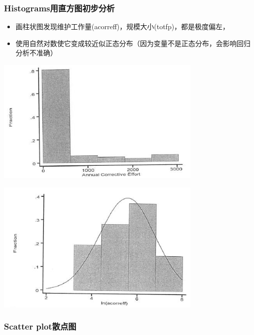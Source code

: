 \hypertarget{histogramsux7528ux76f4ux65b9ux56feux521dux6b65ux5206ux6790}{%
\subsubsection{Histograms用直方图初步分析}\label{histogramsux7528ux76f4ux65b9ux56feux521dux6b65ux5206ux6790}}

\begin{itemize}
\tightlist
\item
  画柱状图发现维护工作量(acorreff)，规模大小(totfp)，都是极度偏左，
\item
  使用自然对数使它变成较近似正态分布（因为变量不是正态分布，会影响回归分析不准确）
\end{itemize}


\includegraphics[width=10cm]{maxwell_f56.jpg}


\includegraphics[width=10cm]{maxwell_f58.jpg}

\hypertarget{scatter-plotux6563ux70b9ux56fe}{%
\subsubsection{Scatter
plot散点图}\label{scatter-plotux6563ux70b9ux56fe}}

